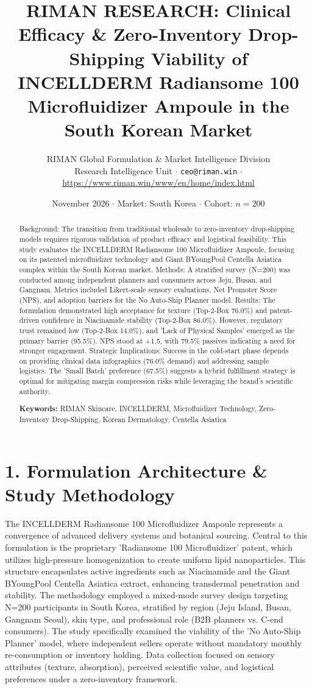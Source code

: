 \documentclass[10pt,twocolumn,a4paper]{article}
\title{\textbf{RIMAN RESEARCH: Clinical Efficacy \& Zero-Inventory Drop-Shipping Viability of INCELLDERM Radiansome 100 Microfluidizer Ampoule in the South Korean Market}}
\author{RIMAN Global Formulation \& Market Intelligence Division\\
\small Research Intelligence Unit $\cdot$ \texttt{ceo@riman.win} $\cdot$ \url{https://www.riman.win/www/en/home/index.html}}
\date{November 2026 \quad $\cdot$ \quad Market: South Korea \quad $\cdot$ \quad Cohort: $n = 200$}
\begin{document}
\maketitle

\begin{abstract}
Background: The transition from traditional wholesale to zero-inventory drop-shipping models requires rigorous validation of product efficacy and logistical feasibility. This study evaluates the INCELLDERM Radiansome 100 Microfluidizer Ampoule, focusing on its patented microfluidizer technology and Giant BYoungPool Centella Asiatica complex within the South Korean market. Methods: A stratified survey (N=200) was conducted among independent planners and consumers across Jeju, Busan, and Gangnam. Metrics included Likert-scale sensory evaluations, Net Promoter Score (NPS), and adoption barriers for the No Auto-Ship Planner model. Results: The formulation demonstrated high acceptance for texture (Top-2-Box 76.0\%) and patent-driven confidence in Niacinamide stability (Top-2-Box 86.0\%). However, regulatory trust remained low (Top-2-Box 14.0\%), and 'Lack of Physical Samples' emerged as the primary barrier (95.5\%). NPS stood at +1.5, with 79.5\% passives indicating a need for stronger engagement. Strategic Implications: Success in the cold-start phase depends on providing clinical data infographics (76.0\% demand) and addressing sample logistics. The 'Small Batch' preference (67.5\%) suggests a hybrid fulfillment strategy is optimal for mitigating margin compression risks while leveraging the brand's scientific authority.

\vspace{0.4em}
\noindent\textbf{Keywords:} RIMAN Skincare, INCELLDERM, Microfluidizer Technology, Zero-Inventory Drop-Shipping, Korean Dermatology, Centella Asiatica
\end{abstract}

\section{1. Formulation Architecture \& Study Methodology}
The INCELLDERM Radiansome 100 Microfluidizer Ampoule represents a convergence of advanced delivery systems and botanical sourcing. Central to this formulation is the proprietary 'Radiansome 100 Microfluidizer' patent, which utilizes high-pressure homogenization to create uniform lipid nanoparticles. This structure encapsulates active ingredients such as Niacinamide and the Giant BYoungPool Centella Asiatica extract, enhancing transdermal penetration and stability. The methodology employed a mixed-mode survey design targeting N=200 participants in South Korea, stratified by region (Jeju Island, Busan, Gangnam Seoul), skin type, and professional role (B2B planners vs. C-end consumers). The study specifically examined the viability of the 'No Auto-Ship Planner' model, where independent sellers operate without mandatory monthly re-consumption or inventory holding. Data collection focused on sensory attributes (texture, absorption), perceived scientific value, and logistical preferences under a zero-inventory framework.
\end{document}
